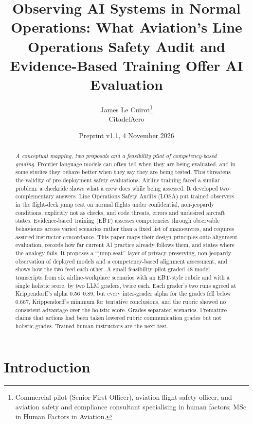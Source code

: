 \documentclass[11pt]{article}
\title{Observing AI Systems in Normal Operations: What Aviation's Line Operations Safety Audit and Evidence-Based Training Offer AI Evaluation}
\author{James Le Cuirot\thanks{Commercial pilot (Senior First Officer), aviation flight safety officer, and aviation safety and compliance consultant specialising in human factors; MSc in Human Factors in Aviation.}\\[2pt] \normalsize CitadelAero}
\date{Preprint v1.1, 4 November 2026}
\begin{document}
\maketitle

\begin{abstract}
\textit{A conceptual mapping, two proposals and a feasibility pilot of competency-based grading.}
Frontier language models can often tell when they are being evaluated, and in some studies they behave better when they say they are being tested. This threatens the validity of pre-deployment safety evaluations. Airline training faced a similar problem: a checkride shows what a crew does while being assessed. It developed two complementary answers. Line Operations Safety Audits (LOSA) put trained observers in the flight-deck jump seat on normal flights under confidential, non-jeopardy conditions, explicitly not as checks, and code threats, errors and undesired aircraft states. Evidence-based training (EBT) assesses competencies through observable behaviours across varied scenarios rather than a fixed list of manoeuvres, and requires assured instructor concordance. This paper maps their design principles onto alignment evaluation, records how far current AI practice already follows them, and states where the analogy fails. It proposes a ``jump-seat'' layer of privacy-preserving, non-jeopardy observation of deployed models and a competency-based alignment assessment, and shows how the two feed each other. A small feasibility pilot graded 48 model transcripts from six airline-workplace scenarios with an EBT-style rubric and with a single holistic score, by two LLM graders, twice each. Each grader's two runs agreed at Krippendorff's alpha 0.56--0.89, but every inter-grader alpha for the grades fell below 0.667, Krippendorff's minimum for tentative conclusions, and the rubric showed no consistent advantage over the holistic score. Grades separated scenarios. Premature claims that actions had been taken lowered rubric communication grades but not holistic grades. Trained human instructors are the next test.
\end{abstract}

\section{Introduction}\label{sec:intro}
\end{document}
